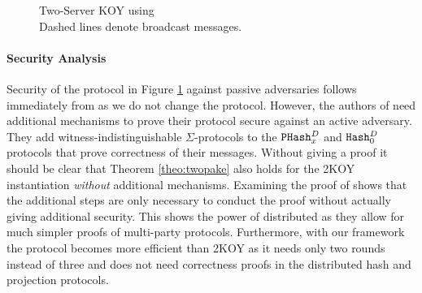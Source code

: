 \begin{figure}[tbhp]
\caption{Two-Server KOY \cite{Katz_MacKenzie_Taban_Gligor_2005} using \SPHFF
\\{\tiny Dashed lines denote broadcast messages.}}
\label{fig:twokoy}
\end{figure}

\paragraph{Security Analysis}
Security of the protocol in Figure \ref{fig:twokoy} against passive adversaries follows immediately from \cite[Theorem 1]{Katz_MacKenzie_Taban_Gligor_2005} as we do not change the protocol.
However, the authors of \cite{Katz_MacKenzie_Taban_Gligor_2005} need additional mechanisms to prove their protocol secure against an active adversary.
They add witness-indistinguishable $\Sigma$-protocols to the $\mathtt{PHash}_x^{D}$ and $\mathtt{Hash}_0^{D}$ protocols that prove correctness of their messages.
Without giving a proof it should be clear that Theorem \ref{theo:twopake} also holds for the 2KOY instantiation \emph{without} additional mechanisms.
Examining the proof of \cite[Theorem 2]{Katz_MacKenzie_Taban_Gligor_2005} shows that the additional steps are only necessary to conduct the proof without actually giving additional security.
This shows the power of distributed \SPHFF as they allow for much simpler proofs of multi-party protocols.
Furthermore, with our framework the protocol becomes more efficient than 2KOY as it needs only two rounds instead of three and does not need correctness proofs in the distributed hash and projection protocols.
